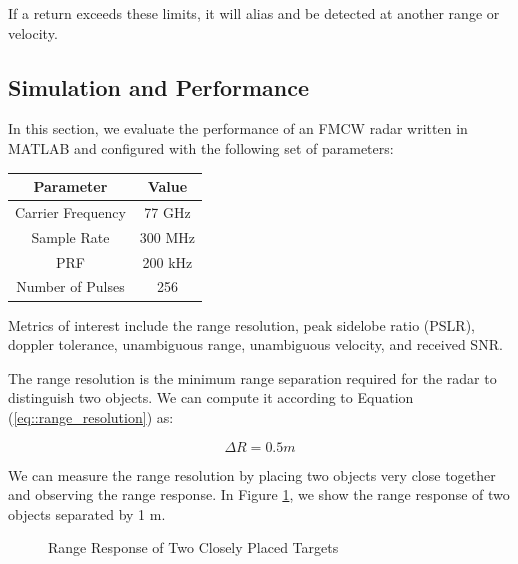 \documentclass[conference]{IEEEtran}
\begin{document}
	If a return exceeds these limits, it will alias and be detected at another range or velocity.
	
	\subsection {Simulation and Performance}

In this section, we evaluate the performance of an FMCW radar written in MATLAB and configured with the following set of parameters:

	\begin{center}
	\begin{tabular}{|c|c|}
		\hline
		Parameter & Value \\
		\hline
		Carrier Frequency & 77 GHz \\
		\hline
		Sample Rate & 300 MHz \\
		\hline
		PRF & 200 kHz \\
		\hline
		Number of Pulses & 256 \\
		\hline	
	\end{tabular}
	\end{center}
	
	Metrics of interest include the range resolution, peak sidelobe ratio (PSLR), doppler tolerance, unambiguous range, unambiguous velocity, and received SNR.

	The range resolution is the minimum range separation required for the radar to distinguish two objects. We can compute it according to Equation (\ref{eq::range_resolution}) as:
	
	\begin{equation}
		{\Delta}R = 0.5 m
	\end{equation}
	
	We can measure the range resolution by placing two objects very close together and observing the range response. In Figure \ref{fig::range_resolution}, we show the range response of two objects separated by 1 m. 
	 
	\begin{figure}[H]
	    	\centering
	    	\caption{Range Response of Two Closely Placed Targets}
	    	\label{fig::range_resolution}
	\end{figure}
		
\end{document}
